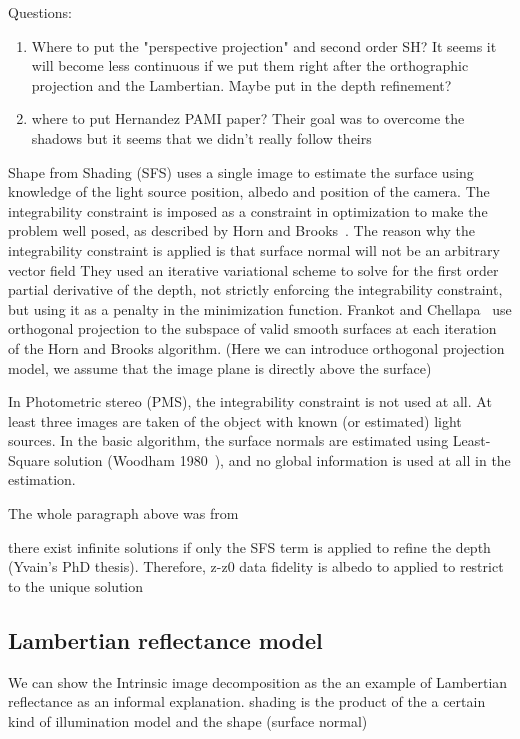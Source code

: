 {\color{red} Questions:}
\begin{enumerate}
\item Where to put the "perspective projection" and second order SH? It seems it will become less continuous if we put them right after the orthographic projection and the Lambertian. Maybe put in the depth refinement? 
\item where to put Hernandez PAMI paper? Their goal was to overcome the shadows but it seems that we didn't really follow theirs
\end{enumerate}

Shape from Shading (SFS) uses a single image to estimate the surface using knowledge of the light source position, albedo and position of the camera. The integrability constraint is imposed as a constraint in optimization to make the problem well posed, as described by Horn and Brooks~\cite{horn1986variational}.
The reason why the integrability constraint is applied is that surface normal will not be an arbitrary vector field
They used an iterative variational scheme to solve for the first order partial derivative of the depth, not strictly enforcing the integrability constraint, but using it as a penalty in the minimization function.
 Frankot and Chellapa~\cite{frankot1988method} use orthogonal projection to the subspace of valid smooth surfaces at each iteration of the Horn and Brooks algorithm. (Here we can introduce orthogonal projection model, we assume that the image plane is directly above the surface)
 
In Photometric stereo (PMS), the integrability constraint is not used at all. At least three images are taken of the object with known (or estimated) light sources.  In the basic algorithm, the surface normals are estimated using Least-Square solution (Woodham 1980~\cite{woodham1980photometric}), and no global information is used at all in the estimation. 

The whole paragraph above was from~\cite{petrovic2001enforcing}






there exist infinite solutions if only the SFS term is applied to refine the depth (Yvain's PhD thesis). Therefore, z-z0 data fidelity is albedo to applied to restrict to the unique solution 
\subsection{Lambertian reflectance model}
We can show the Intrinsic image decomposition as the an example of Lambertian reflectance as an informal explanation. shading is the product of the a certain kind of illumination model and the shape (surface normal)~\cite{barron2015shape}

